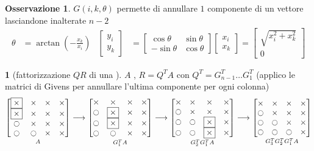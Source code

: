 \documentclass[a4paper,10pt]{article}
\theoremstyle{definition}
\theoremstyle{indentdefinition}
\theoremstyle{indenttheorem}
\theoremstyle{myremark}
\newtheorem*{rem*}{Osservazione}
\theoremstyle{indentgeneral}
\newtheorem{lyxalgorithm}[thm]{\protect\algorithmname}
\theoremstyle{plain}
\theoremstyle{plain}
\begin{document}
\begin{rem*}
$G\left(i,k,\theta\right)$ permette di annullare $1$ componente
di un vettore lasciandone inalterate $n-2$
\begin{align*}
\theta & =\arctan\left(-\frac{x_{k}}{x_{i}}\right) & \begin{bmatrix}y_{i}\\
y_{k}
\end{bmatrix} & =\begin{bmatrix}\cos\theta & \sin\theta\\
-\sin\theta & \cos\theta
\end{bmatrix}\begin{bmatrix}x_{i}\\
x_{k}
\end{bmatrix}=\begin{bmatrix}\sqrt{x_{i}^{2}+x_{k}^{2}}\\
0
\end{bmatrix}
\end{align*}
%
\end{rem*}
\begin{lyxalgorithm}[fattorizzazione $QR$ di una ]
\label{alg:fattorizzazione-QR-matrice-Hessenberg}$A$ ,
$R=Q^{T}A$ con $Q^{T}=G_{n-1}^{T}\ldots G_{1}^{T}$ (applico le matrici
di Givens per annullare l'ultima componente per ogni colonna)
\[
\underset{A}{\begin{bmatrix}\boxed{\times} & \times & \times & \times\\
\boxed{\times} & \times & \times & \times\\
\ocircle & \times & \times & \times\\
\ocircle & \ocircle & \times & \times
\end{bmatrix}}\longrightarrow\underset{G_{1}^{T}A}{\begin{bmatrix}\times & \times & \times & \times\\
\ocircle & \boxed{\times} & \times & \times\\
\ocircle & \boxed{\times} & \times & \times\\
\ocircle & \ocircle & \times & \times
\end{bmatrix}}\longrightarrow\underset{G_{2}^{T}G_{1}^{T}A}{\begin{bmatrix}\times & \times & \times & \times\\
\ocircle & \times & \times & \times\\
\ocircle & \ocircle & \boxed{\times} & \times\\
\ocircle & \ocircle & \boxed{\times} & \times
\end{bmatrix}}\longrightarrow\underset{G_{3}^{T}G_{2}^{T}G_{1}^{T}A}{\begin{bmatrix}\times & \times & \times & \times\\
\ocircle & \times & \times & \times\\
\ocircle & \ocircle & \times & \times\\
\ocircle & \ocircle & \ocircle & \times
\end{bmatrix}}
\]
\end{lyxalgorithm}
\end{document}
